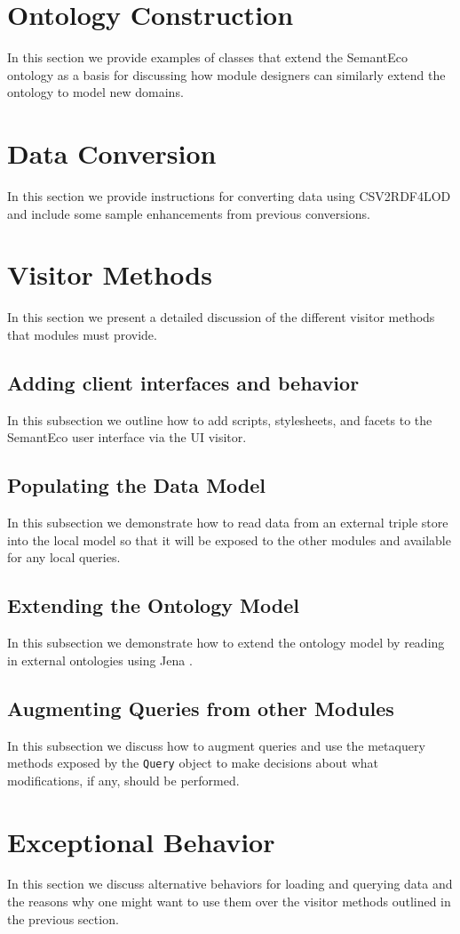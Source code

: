 \documentclass[letterpaper]{report}
\begin{document}
\section{Ontology Construction}
\label{ontology-construction}
In this section we provide examples of classes that extend the SemantEco ontology as a basis for discussing how module designers can similarly extend the ontology to model new domains.
\section{Data Conversion}
In this section we provide instructions for converting data using CSV2RDF4LOD \cite{lebo2011producing} and include some sample enhancements from previous conversions.
\section{Visitor Methods}
\label{visitors}
In this section we present a detailed discussion of the different visitor methods that modules must provide.
\subsection{Adding client interfaces and behavior}
In this subsection we outline how to add scripts, stylesheets, and facets to the SemantEco user interface via the UI visitor.
\subsection{Populating the Data Model}
In this subsection we demonstrate how to read data from an external triple store into the local model so that it will be exposed to the other modules and available for any local queries.
\subsection{Extending the Ontology Model}
In this subsection we demonstrate how to extend the ontology model by reading in external ontologies using Jena \cite{Jena}.
\subsection{Augmenting Queries from other Modules}
In this subsection we discuss how to augment queries and use the metaquery methods exposed by the \texttt{Query} object to make decisions about what modifications, if any, should be performed.
\section{Exceptional Behavior}
In this section we discuss alternative behaviors for loading and querying data and the reasons why one might want to use them over the visitor methods outlined in the previous section.
\end{document}
